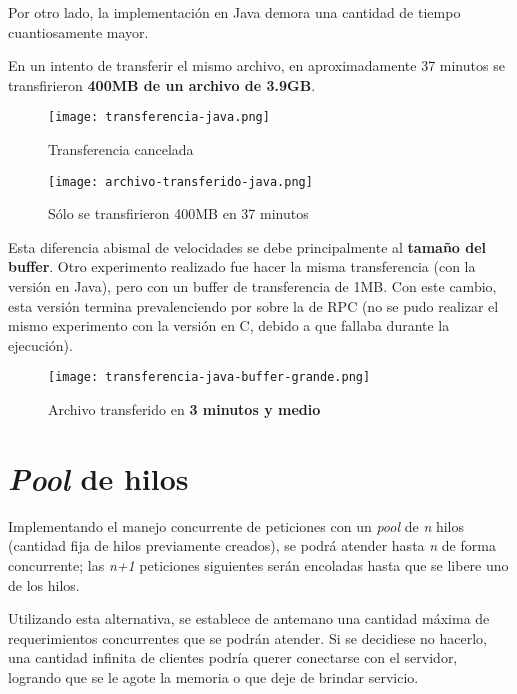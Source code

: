 Por otro lado, la implementación en Java demora una cantidad de tiempo cuantiosamente mayor. 

En un intento de transferir el mismo archivo, en aproximadamente 37 minutos se transfirieron \textbf{400MB de un archivo de 3.9GB}.

\begin{figure}[h]
    \centering
    \texttt{[image: transferencia-java.png]}
    \caption{Transferencia cancelada}
\end{figure}
\begin{figure}[h]
    \centering
    \texttt{[image: archivo-transferido-java.png]}
    \caption{Sólo se transfirieron 400MB en 37 minutos}
\end{figure}

Esta diferencia abismal de velocidades se debe principalmente al \textbf{tamaño del buffer}. Otro experimento realizado fue hacer la misma transferencia (con la versión en Java), pero con un buffer de transferencia de 1MB. Con este cambio, esta versión termina prevalenciendo por sobre la de RPC (no se pudo realizar el mismo experimento con la versión en C, debido a que fallaba durante la ejecución).

\begin{figure}[H]
    \centering
    \texttt{[image: transferencia-java-buffer-grande.png]}
    \caption{Archivo transferido en \textbf{3 minutos y medio} }
\end{figure}

\section{\emph{Pool} de hilos}

Implementando el manejo concurrente de peticiones con un \emph{pool} de \emph{n} hilos (cantidad fija de hilos previamente creados), se podrá atender hasta \emph{n} de forma concurrente; las \emph{n+1} peticiones siguientes serán encoladas hasta que se libere uno de los hilos. 

Utilizando esta alternativa, se establece de antemano una cantidad máxima de requerimientos concurrentes que se podrán atender. Si se decidiese no hacerlo, una cantidad infinita de clientes podría querer conectarse con el servidor, logrando que se le agote la memoria o que deje de brindar servicio.





\clearpage
\printbibliography



